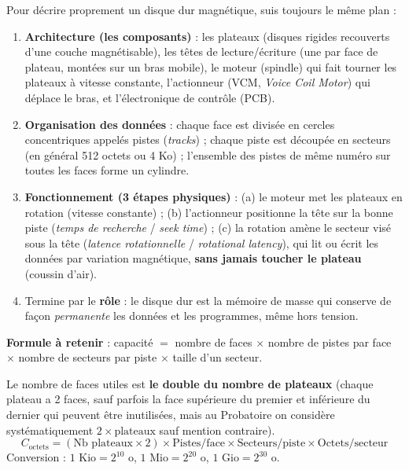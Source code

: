 \documentclass[11pt]{article}
\newcommand{\cle}[1]{{\popxbold\color{popdark}#1}}
\begin{document}
\begin{methode}
Pour décrire proprement un disque dur magnétique, suis toujours le même plan :
\begin{enumerate}
\item \textbf{Architecture (les composants)} : les \cle{plateaux} (disques rigides recouverts d'une couche magnétisable), les \cle{têtes de lecture/écriture} (une par face de plateau, montées sur un bras mobile), le \cle{moteur} (spindle) qui fait tourner les plateaux à vitesse constante, l'\cle{actionneur} (VCM, \emph{Voice Coil Motor}) qui déplace le bras, et l'électronique de contrôle (PCB).
\item \textbf{Organisation des données} : chaque face est divisée en cercles concentriques appelés \cle{pistes} (\emph{tracks}) ; chaque piste est découpée en \cle{secteurs} (en général 512 octets ou 4 Ko) ; l'ensemble des pistes de même numéro sur toutes les faces forme un \cle{cylindre}.
\item \textbf{Fonctionnement (3 étapes physiques)} : (a) le moteur met les plateaux en rotation (vitesse constante) ; (b) l'actionneur positionne la tête sur la bonne piste (\emph{temps de recherche} / \emph{seek time}) ; (c) la rotation amène le secteur visé sous la tête (\emph{latence rotationnelle} / \emph{rotational latency}), qui lit ou écrit les données par variation magnétique, \textbf{sans jamais toucher le plateau} (coussin d'air).
\item Termine par le \textbf{rôle} : le disque dur est la mémoire de masse qui conserve de façon \emph{permanente} les données et les programmes, même hors tension.
\end{enumerate}
\textbf{Formule à retenir} : capacité $=$ nombre de faces $\times$ nombre de pistes par face $\times$ nombre de secteurs par piste $\times$ taille d'un secteur.
\end{methode}

\begin{aretenir}
Le nombre de faces utiles est \textbf{le double du nombre de plateaux} (chaque plateau a 2 faces, sauf parfois la face supérieure du premier et inférieure du dernier qui peuvent être inutilisées, mais au Probatoire on considère systématiquement $2 \times \text{plateaux}$ sauf mention contraire).
\[ C_{\text{octets}} = (\text{Nb plateaux} \times 2) \times \text{Pistes/face} \times \text{Secteurs/piste} \times \text{Octets/secteur} \]
Conversion : $1 \text{ Kio} = 2^{10}$ o, $1 \text{ Mio} = 2^{20}$ o, $1 \text{ Gio} = 2^{30}$ o.
\end{aretenir}
\end{document}
